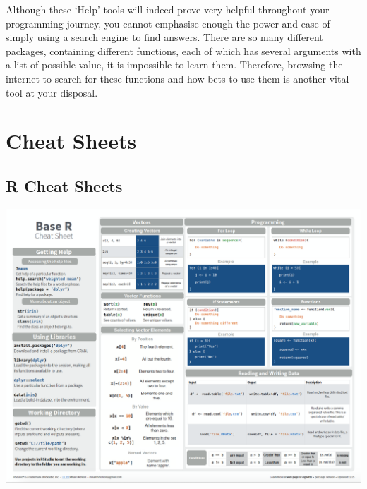 \documentclass[
]{book}
\theoremstyle{definition}
\theoremstyle{definition}
\theoremstyle{definition}
\theoremstyle{definition}
\theoremstyle{remark}
\begin{document}
Although these `Help' tools will indeed prove very helpful throughout your programming journey, you cannot emphasise enough the power and ease of simply using a search engine to find answers. There are so many different packages, containing different functions, each of which has several arguments with a list of possible value, it is impossible to learn them. Therefore, browsing the internet to search for these functions and how bets to use them is another vital tool at your disposal.

\hypertarget{cheat-sheets}{%
\chapter{Cheat Sheets}\label{cheat-sheets}}

\hypertarget{r-cheat-sheets}{%
\section*{R Cheat Sheets}\label{r-cheat-sheets}}

\begin{center}\includegraphics{Figures/R-cheat-sheet} \end{center}
\end{document}
